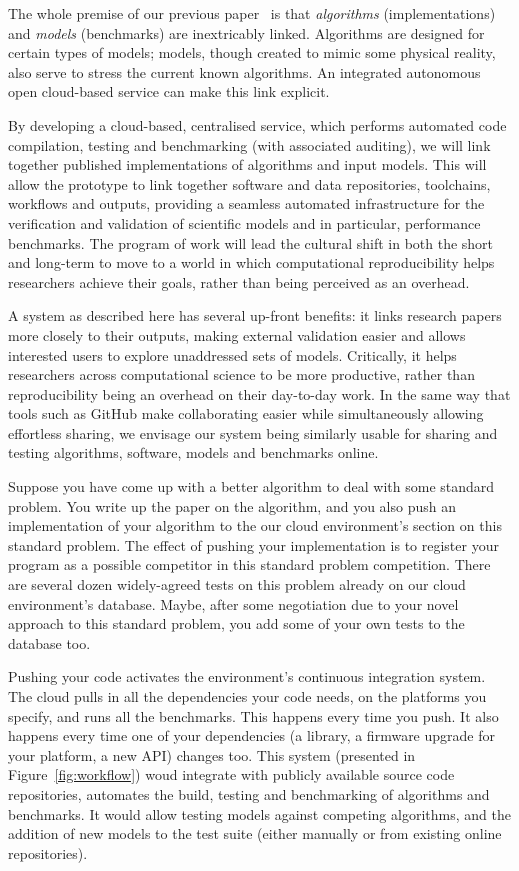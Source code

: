 \documentclass[a4paper,11pt]{article}
\begin{document}
The whole premise of our previous paper~\cite{crick-et-al_recomp2014}
is that {\emph{algorithms}} (implementations) and {\emph{models}}
(benchmarks) are inextricably linked. Algorithms are designed for
certain types of models; models, though created to mimic some physical
reality, also serve to stress the current known algorithms. An
integrated autonomous open cloud-based service can make this link explicit.

By developing a cloud-based, centralised service, which performs
automated code compilation, testing and benchmarking (with associated
auditing), we will link together published implementations of
algorithms and input models. This will allow the prototype to link
together software and data repositories, toolchains, workflows and
outputs, providing a seamless automated infrastructure for the
verification and validation of scientific models and in particular,
performance benchmarks. The program of work will lead the cultural
shift in both the short and long-term to move to a world in which
computational reproducibility helps researchers achieve their goals,
rather than being perceived as an overhead.

A system as described here has several up-front benefits: it links
research papers more closely to their outputs, making external
validation easier and allows interested users to explore unaddressed
sets of models. Critically, it helps researchers across computational
science to be more productive, rather than reproducibility being an
overhead on their day-to-day work. In the same way that tools such as
GitHub make collaborating easier while simultaneously allowing
effortless sharing, we envisage our system being similarly usable for
sharing and testing algorithms, software, models and benchmarks
online.

Suppose you have come up with a better algorithm to deal with some
standard problem.  You write up the paper on the algorithm, and you
also push an implementation of your algorithm to the our cloud
environment's section on this standard problem. The effect of pushing
your implementation is to register your program as a possible
competitor in this standard problem competition. There are several
dozen widely-agreed tests on this problem already on our cloud
environment's database. Maybe, after some negotiation due to your
novel approach to this standard problem, you add some of your own
tests to the database too.

Pushing your code activates the environment's continuous integration
system.  The cloud pulls in all the dependencies your code needs, on
the platforms you specify, and runs all the benchmarks. This happens
every time you push. It also happens every time one of your
dependencies (a library, a firmware upgrade for your platform, a new
API) changes too. This system (presented in Figure~\ref{fig:workflow}) woud
integrate with publicly available source code repositories, automates
the build, testing and benchmarking of algorithms and benchmarks. It
would allow testing models against competing algorithms, and the
addition of new models to the test suite (either manually or from
existing online repositories).
\end{document}
